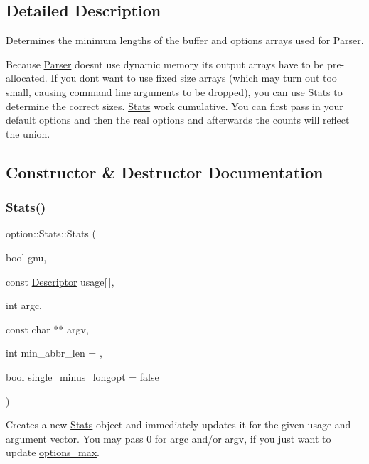 \subsection{Detailed Description}
Determines the minimum lengths of the buffer and options arrays used for \hyperlink{classoption_1_1_parser}{Parser}. 

Because \hyperlink{classoption_1_1_parser}{Parser} doesn\textquotesingle{}t use dynamic memory its output arrays have to be pre-\/allocated. If you don\textquotesingle{}t want to use fixed size arrays (which may turn out too small, causing command line arguments to be dropped), you can use \hyperlink{structoption_1_1_stats}{Stats} to determine the correct sizes. \hyperlink{structoption_1_1_stats}{Stats} work cumulative. You can first pass in your default options and then the real options and afterwards the counts will reflect the union. 

\subsection{Constructor \& Destructor Documentation}
\mbox{\label{structoption_1_1_stats_a71373ec2b28842f45593e4405f7bc8ec}} 
\subsubsection{\texorpdfstring{Stats()}{Stats()}}
{\footnotesize\ttfamily option\+::\+Stats\+::\+Stats (\begin{DoxyParamCaption}\item[{bool}]{gnu,  }\item[{const \hyperlink{structoption_1_1_descriptor}{Descriptor}}]{usage\mbox{[}$\,$\mbox{]},  }\item[{int}]{argc,  }\item[{const char $\ast$$\ast$}]{argv,  }\item[{int}]{min\+\_\+abbr\+\_\+len = {},  }\item[{bool}]{single\+\_\+minus\+\_\+longopt = {\ttfamily false} }\end{DoxyParamCaption})\hspace{0.3cm}{\ttfamily [inline]}}



Creates a new \hyperlink{structoption_1_1_stats}{Stats} object and immediately updates it for the given {\ttfamily usage} and argument vector. You may pass 0 for {\ttfamily argc} and/or {\ttfamily argv}, if you just want to update \hyperlink{structoption_1_1_stats_a8121787feb1c7db84fca3ccb012b0473}{options\+\_\+max}. 

